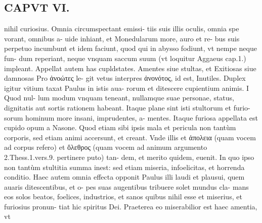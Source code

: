 \documentclass{article}
\begin{document}
\begin{pages}
\section*{CAPVT  VI. }
\marginpar{[ p.451 ]}\pstart nihil curiosius. Omnia circumspectant emissi- tiis suis illis oculis, omnia spe vorant, omnibus a- uide inhiant, et Monedularum more, auro et re- bus suis perpetuo incumbunt et idem faciunt, quod qui in abysso fodiunt, vt nempe neque fun- dum reperiant, neque vnquam saccum suum (vt loquitur Aggaeus cap.1.) impleant.  \pend\pstart Appellat autem has cupldstates. Amentes siue stultas, et Exitiosas siue damnosas Pro ἀνοώτες le- git vetus interpres ἀνονότος, id est, Inutiles.  \pend\pstart Duplex igitur vitium taxat Paulus in istis aua- rorum et ditescere cupientium animis. I Quod nul- lum modum vnquam teneant, nullamque suae personae, status, dignitatis aut sortis rationem habeant. Itaque plane sint isti stultorum et furio- sorum hominum more insani, imprudentes, a- mentes. Itaque  furiosa appellata est cupido opum a Nasone.  \pend{} Quod etiam sibi ipsis mala et pericula non tantùm corporis, sed etiam animi accersunt, et creant. Vnde illis et ἀπολεια (quam vocem ad corpus refero) et ὄλεθρος (quam vocem ad animum argumento 2.Thess.1.vers.9. pertinere puto) tan- dem, et merito quidem, euenit. In quo ipso non tantùm stultitia summa inest: sed etiam miseria, infoelicitas, et horrenda conditio.  \pend\pstart Haec autem omnia effecta opponit Paulus illi laudi et plausui, quem auaris ditescentibus, et o- pes suas augentibus tribuere solet mundus cla- mans eos solos beatos, foelices, industrios, et sanos quibus nihil esse et miserius, et furiosius pronun- tiat hic spiritus Dei.  \pend\pstart Praeterea eo miserabilior est haec amentia, vt  \pend

\end{pages}
\end{document}
